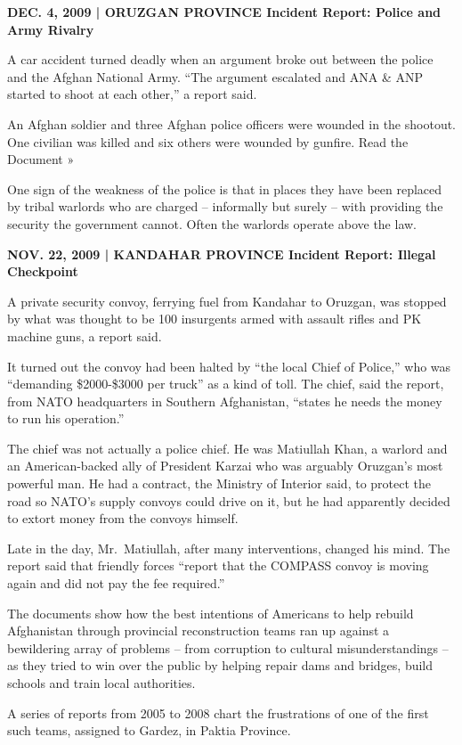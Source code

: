 ﻿\documentclass[12pt]{article}
\begin{document}
\textbf{DEC. 4, 2009 | ORUZGAN PROVINCE Incident Report: Police and Army Rivalry}

A car accident turned deadly when an argument broke out between the police and the Afghan National
Army. ``The argument escalated and ANA \& ANP started to shoot at each other,'' a report said.

An Afghan soldier and three Afghan police officers were wounded in the shootout. One civilian was
killed and six others were wounded by gunfire. Read the Document »

One sign of the weakness of the police is that in places they have been replaced by tribal warlords
who are charged -- informally but surely -- with providing the security the government cannot. Often
the warlords operate above the law.

\textbf{NOV. 22, 2009 | KANDAHAR PROVINCE Incident Report: Illegal Checkpoint}

A private security convoy, ferrying fuel from Kandahar to Oruzgan, was stopped by what was thought
to be 100 insurgents armed with assault rifles and PK machine guns, a report said.

It turned out the convoy had been halted by ``the local Chief of Police,'' who was ``demanding
\$2000-\$3000 per truck'' as a kind of toll. The chief, said the report, from NATO headquarters in
Southern Afghanistan, ``states he needs the money to run his operation.''

The chief was not actually a police chief. He was Matiullah Khan, a warlord and an American-backed
ally of President Karzai who was arguably Oruzgan's most powerful man. He had a contract, the
Ministry of Interior said, to protect the road so NATO's supply convoys could drive on it, but he
had apparently decided to extort money from the convoys himself.

Late in the day, Mr.~Matiullah, after many interventions, changed his mind. The report said that
friendly forces ``report that the COMPASS convoy is moving again and did not pay the fee required.''

The documents show how the best intentions of Americans to help rebuild Afghanistan through
provincial reconstruction teams ran up against a bewildering array of problems -- from corruption to
cultural misunderstandings -- as they tried to win over the public by helping repair dams and
bridges, build schools and train local authorities.

A series of reports from 2005 to 2008 chart the frustrations of one of the first such teams,
assigned to Gardez, in Paktia Province.
\end{document}
